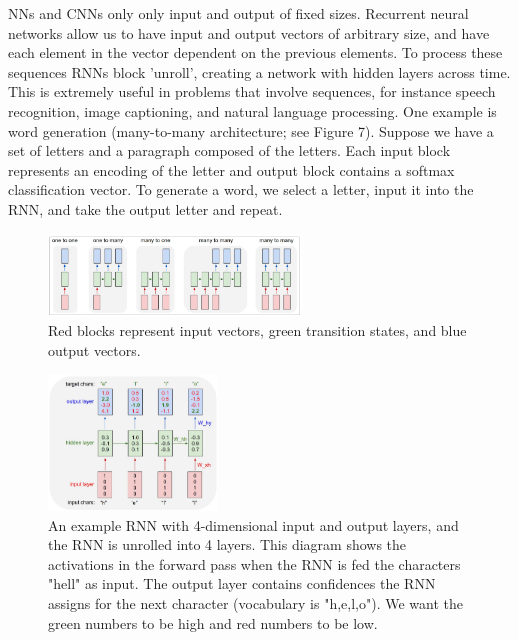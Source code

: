 \documentclass{article}
\begin{document}
NNs and CNNs only only input and output of fixed sizes. Recurrent neural networks allow us to have input and output vectors of arbitrary size, and have each element in the vector dependent on the previous elements. To process these sequences RNNs block 'unroll', creating a network with hidden layers across time. This is extremely useful in problems that involve sequences, for instance speech recognition, image captioning, and natural language processing. One example is word generation (many-to-many architecture; see Figure 7). Suppose we have a set of letters and a paragraph composed of the letters. Each input block represents an encoding of the letter and output block contains a softmax classification vector. To generate a word, we select a letter, input it into the RNN, and take the output letter and repeat.

\begin{figure}[H]
    \begin{center}
        \includegraphics[width=0.6\textwidth]{RNNS.jpg}
    \end{center}
    \vspace{-10pt}
    \caption{Red blocks represent input vectors, green transition states, and blue output vectors.}
\end{figure}

\begin{figure}[H]
    \begin{center}
        \includegraphics[width=0.4\textwidth]{CLM.jpg}
    \end{center}
    \vspace{-10pt}
    \caption{An example RNN with 4-dimensional input and output layers, and the RNN is unrolled into 4 layers. This diagram shows the activations in the forward pass when the RNN is fed the characters "hell" as input. The output layer contains confidences the RNN assigns for the next character (vocabulary is "h,e,l,o"). We want the green numbers to be high and red numbers to be low.}
\end{figure}
\end{document}
